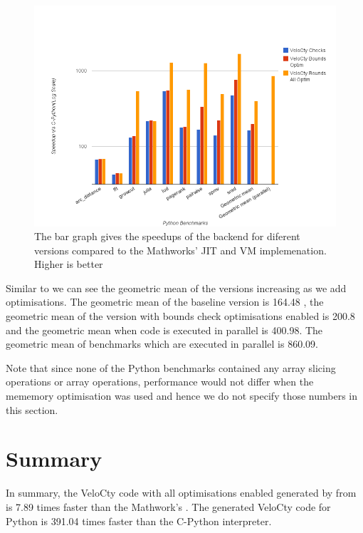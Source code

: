 \begin{figure}[htbp]
\centering
\includegraphics[scale=0.5]{Figures/final_py.png}
\caption[Summary of Python Results]{The bar graph gives the speedups of the \velocty backend for diferent \velocty versions compared to the Mathworks' JIT and VM implemenation. Higher is better }
\label{fig:results_final}
\end{figure}

Similar to \matlab we can see the geometric mean of the \velocty versions increasing as we add optimisations. The geometric mean of the baseline \velocty version is 164.48 , the geometric mean of the version with bounds check optimisations enabled is 200.8 and the geometric mean when \velocty code is executed in parallel is 400.98. The geometric mean of benchmarks which are executed in parallel is 860.09.

Note that since none of the Python benchmarks contained any array slicing operations or array operations, performance would not differ when the mememory optimisation was used and hence we do not specify those numbers in this section. 
\section{Summary}
In summary, the VeloCty code with all optimisations enabled generated by \velocty from \matlab is 7.89 times faster than the Mathwork's \matlab. The generated VeloCty code for Python is 391.04 times faster than the C-Python interpreter.  
